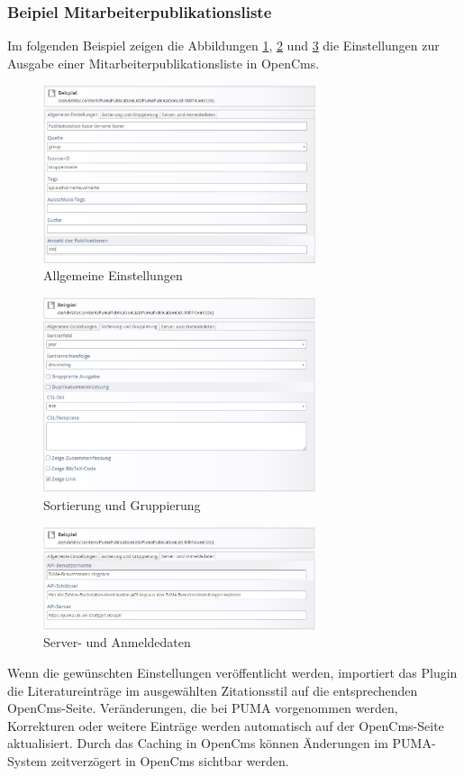 \subsubsection*{Beipiel Mitarbeiterpublikationsliste}\label{sss:mpl}
Im folgenden Beispiel zeigen die Abbildungen \ref{fig:mplAllgemeineEinstellungen}, \ref{fig:mplSortierungGruppierung} und \ref{fig:mplServerAnmeldedaten} die Einstellungen zur Ausgabe einer Mitarbeiterpublikationsliste in OpenCms.

\begin{figure}[h!]
 \centering
 \includegraphics[width=8cm]{Bilder/Kapitel9/Mitarbeiterliste1.jpeg}
 \caption{Allgemeine Einstellungen}
 \label{fig:mplAllgemeineEinstellungen}
\end{figure}
\begin{figure}[h!]
 \centering
 \includegraphics[width=8cm]{Bilder/Kapitel9/Mitarbeiterliste2.jpeg}
 \caption{Sortierung und Gruppierung}
 \label{fig:mplSortierungGruppierung}
\end{figure}
\begin{figure}[h!]
 \centering
 \includegraphics[width=8cm]{Bilder/Kapitel9/Mitarbeiterliste3.jpeg}
 \caption{Server- und Anmeldedaten}
 \label{fig:mplServerAnmeldedaten}
\end{figure}
Wenn die gewünschten Einstellungen veröffentlicht werden, importiert das Plugin die Literatureinträge im ausgewählten Zitationsstil auf die entsprechenden OpenCms-Seite. Veränderungen, die bei PUMA vorgenommen werden, Korrekturen oder weitere Einträge werden automatisch auf der OpenCms-Seite aktualisiert. Durch das Caching in OpenCms können Änderungen im PUMA-System zeitverzögert in OpenCms sichtbar werden.

